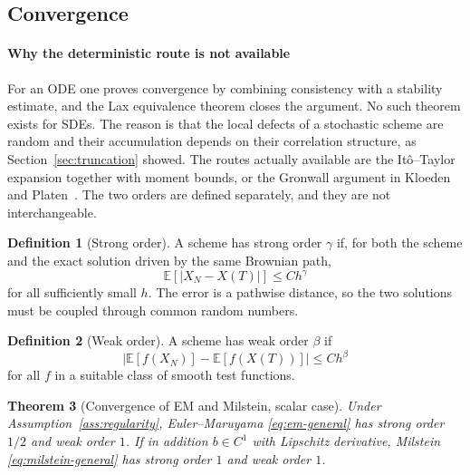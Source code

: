 \documentclass[11pt,a4paper]{article}
\newtheorem{theorem}{Theorem}[section]
\theoremstyle{definition}
\newtheorem{definition}[theorem]{Definition}
\theoremstyle{remark}
\begin{document}
\subsection{Convergence}
\label{sec:convergence}

\paragraph{Why the deterministic route is not available}
For an ODE one proves convergence by combining consistency with a stability
estimate, and the Lax equivalence theorem closes the argument. No such theorem
exists for SDEs. The reason is that the local defects of a stochastic scheme
are random and their accumulation depends on their correlation structure, as
Section~\ref{sec:truncation} showed. The routes actually available are the
It\^o--Taylor expansion together with moment bounds, or the Gronwall argument
in Kloeden and Platen~\cite{kloeden}. The two orders are defined separately,
and they are not interchangeable.

\begin{definition}[Strong order]
\label{def:strong}
A scheme has strong order $\gamma$ if, for both the scheme and the exact
solution driven by the same Brownian path,
\begin{equation}
    \mathbb{E}\!\left[ \left| X_N - X(T) \right| \right]
    \le C h^{\gamma}
    \label{eq:strong-order}
\end{equation}
for all sufficiently small $h$. The error is a pathwise distance, so the two
solutions must be coupled through common random numbers.
\end{definition}

\begin{definition}[Weak order]
\label{def:weak}
A scheme has weak order $\beta$ if
\begin{equation}
    \left| \mathbb{E}\!\left[ f(X_N) \right]
           - \mathbb{E}\!\left[ f(X(T)) \right] \right|
    \le C h^{\beta}
    \label{eq:weak-order}
\end{equation}
for all $f$ in a suitable class of smooth test functions.
\end{definition}

\begin{theorem}[Convergence of EM and Milstein, scalar case]
\label{thm:convergence}
Under Assumption~\ref{ass:regularity}, Euler--Maruyama \eqref{eq:em-general}
has strong order $1/2$ and weak order $1$. If in addition $b \in C^1$ with
Lipschitz derivative, Milstein \eqref{eq:milstein-general} has strong order $1$
and weak order $1$.
\end{theorem}
\end{document}
